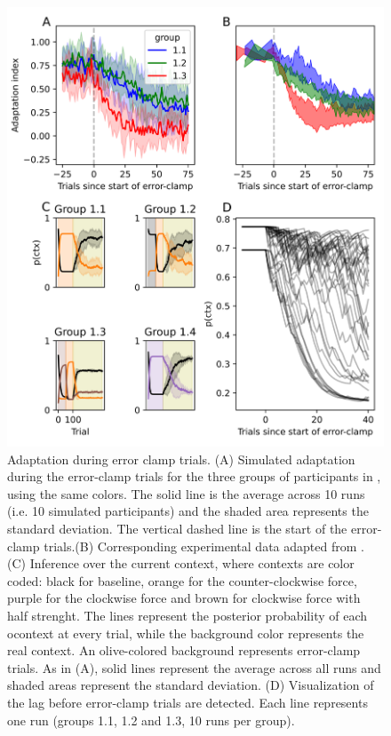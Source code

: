 \documentclass[a4paper,doc,floatsintext,natbib]{apa6}
\begin{document}
\begin{figure}
\centering
\includegraphics[width=\textwidth]{./figures/figure_5.png}
\caption{Adaptation during error clamp trials. (A) Simulated adaptation during the error-clamp trials for the three groups of participants in \cite{Vaswani_Decay_2013}, using the same colors. The solid line is the average across 10 runs (i.e. 10 simulated participants) and the shaded area represents the standard deviation. The vertical dashed line is the start of the error-clamp trials.(B) Corresponding experimental data adapted from \cite{Vaswani_Decay_2013}. (C) Inference over the current context, where contexts are color coded: black for baseline, orange for the counter-clockwise force, purple for the clockwise force and brown for clockwise force with half strenght. The lines represent the posterior probability of each ocontext at every trial, while the background color represents the real context. An olive-colored background represents error-clamp trials. As in (A), solid lines represent the average across all runs and shaded areas represent the standard deviation. (D) Visualization of the lag before error-clamp trials are detected. Each line represents one run (groups 1.1, 1.2 and 1.3, 10 runs per group).}
\label{fig:vaswani-2013}
\end{figure}
\end{document}
